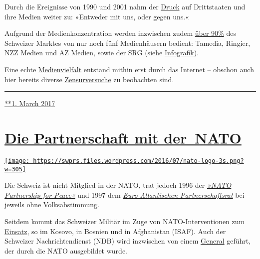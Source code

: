 Durch die Ereignisse von 1990 und 2001 nahm der
\href{https://www.youtube.com/watch?v=a4eGtXFDFJA}{Druck} auf
Drittstaaten und ihre Medien wei­ter zu: »Entweder mit uns, oder gegen
uns.«

Aufgrund der Medien­kon­zen­tration werden in­zwi­schen zudem
\href{https://swprs.files.wordpress.com/2018/03/broschur_jahrbuch_foeg_deutsch_2015.pdf\#page=13}{über
90\%} des Schwei­zer Mark­tes von nur noch fünf Medien­häusern bedient:
Tamedia, Ringier, NZZ Medien und AZ Medien, sowie der SRG (siehe
\href{https://swprs.org/netzwerk-medien-schweiz/}{Info­grafik}).

Eine echte \href{https://swprs.org/medien-navigator/}{Medienvielfalt}
entstand mithin erst durch das Internet -- obschon auch hier bereits
diverse
\href{https://www.heise.de/tp/features/Facebook-Fake-News-und-die-Privatisierung-der-Zensur-3599878.html}{Zensurversuche}
zu beobachten sind.

\begin{center}\rule{0.5\linewidth}{\linethickness}\end{center}

\href{https://swprs.org/2017/03/01/zensur-in-schweizer-medien/}{**1.
March 2017}

\hypertarget{die-partnerschaft-mit-der-nato}{%
\section{\texorpdfstring{\href{https://swprs.org/2017/03/01/schweizer-medien-nato/}{Die
Partnerschaft mit
der~NATO}}{Die Partnerschaft mit der~NATO}}\label{die-partnerschaft-mit-der-nato}}

\href{https://swprs.org/2017/03/01/schweizer-medien-nato/}{\texttt{[image: https://swprs.files.wordpress.com/2016/07/nato-logo-3s.png?w=305]}}

Die Schweiz ist nicht Mit­glied in der NATO, trat jedoch 1996 der
\emph{\href{http://www.pfp.admin.ch/}{»NATO Partner­ship for Peace«}}
und 1997 dem
\emph{\href{http://www.nato.int/docu/review/2007/issue2/german/art5.html}{Euro-Atlan­tischen
Par­tner­schafts­rat}} bei -- je­weils ohne Volks­ab­stimmung.

Seit­dem kommt das Schweizer Militär im Zuge von NATO-Inter­­ven­­tionen
zum \href{https://www.peace-support.ch/de/}{Einsatz}, so im Kosovo, in
Bosnien und in Afgha­ni­stan (ISAF). Auch der Schweizer
Nach­richten­dienst (NDB) wird inzwischen von einem
\href{https://www.admin.ch/gov/de/start/dokumentation/medienmitteilungen.msg-id-70400.html}{General}
geführt, der durch die NATO ausgebildet wurde.


